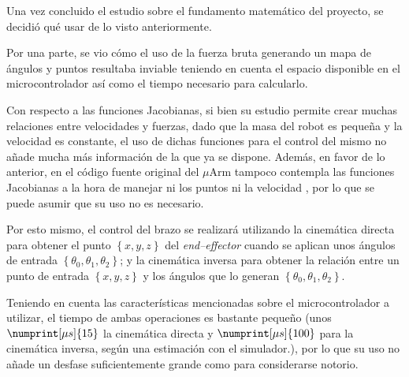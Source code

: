Una vez concluido el estudio sobre el fundamento matemático del proyecto, se decidió
qué usar de lo visto anteriormente.

Por una parte, se vio cómo el uso de la fuerza bruta generando un mapa de ángulos
y puntos resultaba inviable teniendo en cuenta el espacio disponible en el microcontrolador
así como el tiempo necesario para calcularlo.

Con respecto a las funciones Jacobianas, si bien su estudio permite crear muchas
relaciones entre velocidades y fuerzas, dado que la masa del robot es pequeña y la
velocidad es constante, el uso de dichas funciones para el control del mismo no añade
mucha más información de la que ya se dispone. Además, en favor de lo anterior, en el
código fuente original del $\mu$Arm tampoco contempla las funciones Jacobianas a la hora
de manejar ni los puntos ni la velocidad \cite{UArmDeveloperSwiftProForArduino}, por lo
que se puede asumir que su uso no es necesario.

Por esto mismo, el control del brazo se realizará utilizando la cinemática directa
para obtener el punto $\left\{x, y, z\right\}$ del \textit{end--effector} cuando se
aplican unos ángulos de entrada $\left\{\theta_0, \theta_1, \theta_2\right\}$; y la
cinemática inversa para obtener la relación entre un punto de entrada $\left\{x, y, z\right\}$
y los ángulos que lo generan $\left\{\theta_0, \theta_1, \theta_2\right\}$.

Teniendo en cuenta las características mencionadas sobre el microcontrolador a utilizar,
el tiempo de ambas operaciones es bastante pequeño (unos $\numprint[\mu s]{15}$ la
cinemática directa y $\numprint[\mu s]{100}$ para la cinemática inversa, según una
estimación con el simulador.), por lo que su uso no añade un desfase suficientemente
grande como para considerarse notorio.